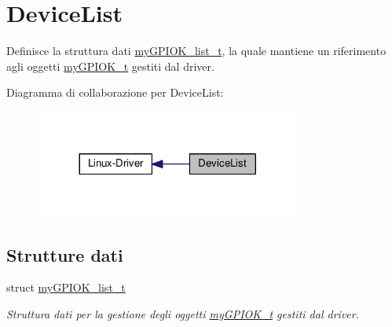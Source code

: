 \hypertarget{group___device_list}{\section{Device\+List}
\label{group___device_list}
}


Definisce la struttura dati \hyperlink{structmy_g_p_i_o_k__list__t}{my\+G\+P\+I\+O\+K\+\_\+list\+\_\+t}, la quale mantiene un riferimento agli oggetti \hyperlink{structmy_g_p_i_o_k__t}{my\+G\+P\+I\+O\+K\+\_\+t} gestiti dal driver.  


Diagramma di collaborazione per Device\+List\+:
\nopagebreak
\begin{figure}[H]
\begin{center}
\leavevmode
\includegraphics[width=248pt]{group___device_list}
\end{center}
\end{figure}
\subsection*{Strutture dati}
\begin{DoxyCompactItemize}
\item 
struct \hyperlink{structmy_g_p_i_o_k__list__t}{my\+G\+P\+I\+O\+K\+\_\+list\+\_\+t}
\begin{DoxyCompactList}\small\item\em Struttura dati per la gestione degli oggetti \hyperlink{structmy_g_p_i_o_k__t}{my\+G\+P\+I\+O\+K\+\_\+t} gestiti dal driver. \end{DoxyCompactList}\end{DoxyCompactItemize}
